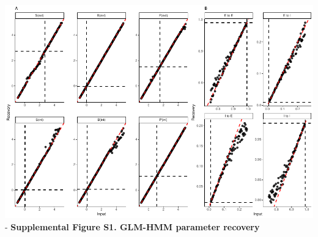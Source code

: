 \documentclass[
]{article}
\begin{document}
\includegraphics{modes_ketamine_scz_files/figure-latex/recovery_plot-1.pdf}
- \textbf{Supplemental Figure S1. GLM-HMM parameter recovery}
\end{document}
